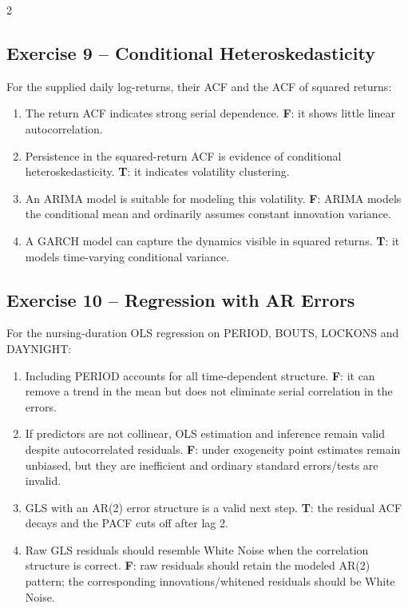 \documentclass[9pt,a4paper]{extarticle}
\begin{document}
\begin{multicols}{2}
\subsection*{Exercise 9 -- Conditional Heteroskedasticity}
For the supplied daily log-returns, their ACF and the ACF of squared returns:
\begin{enumerate}[label=\alph*),leftmargin=4mm]
\item The return ACF indicates strong serial dependence. \textbf{F}: it shows little linear autocorrelation.
\item Persistence in the squared-return ACF is evidence of conditional heteroskedasticity. \textbf{T}: it indicates volatility clustering.
\item An ARIMA model is suitable for modeling this volatility. \textbf{F}: ARIMA models the conditional mean and ordinarily assumes constant innovation variance.
\item A GARCH model can capture the dynamics visible in squared returns. \textbf{T}: it models time-varying conditional variance.
\end{enumerate}

\subsection*{Exercise 10 -- Regression with AR Errors}
For the nursing-duration OLS regression on PERIOD, BOUTS, LOCKONS and DAYNIGHT:
\begin{enumerate}[label=\alph*),leftmargin=4mm]
\item Including PERIOD accounts for all time-dependent structure. \textbf{F}: it can remove a trend in the mean but does not eliminate serial correlation in the errors.
\item If predictors are not collinear, OLS estimation and inference remain valid despite autocorrelated residuals. \textbf{F}: under exogeneity point estimates remain unbiased, but they are inefficient and ordinary standard errors/tests are invalid.
\item GLS with an AR(2) error structure is a valid next step. \textbf{T}: the residual ACF decays and the PACF cuts off after lag 2.
\item Raw GLS residuals should resemble White Noise when the correlation structure is correct. \textbf{F}: raw residuals should retain the modeled AR(2) pattern; the corresponding innovations/whitened residuals should be White Noise.
\end{enumerate}


\end{multicols}
\end{document}
